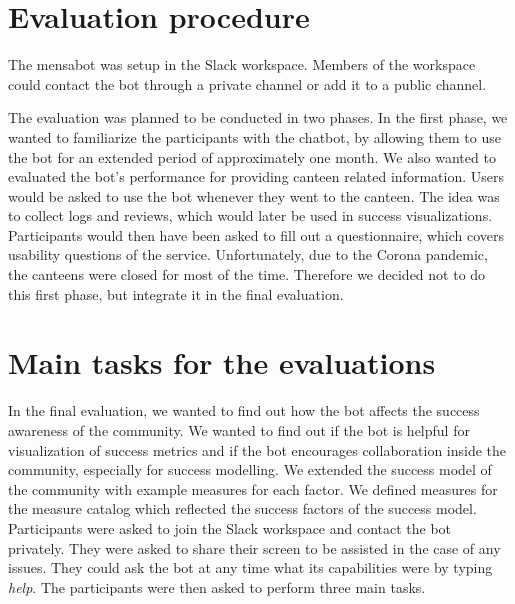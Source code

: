 \section{Evaluation procedure}
The mensabot was setup in the Slack workspace. Members of the workspace could contact the bot through a private channel or add it to a public channel.

The evaluation was planned to be conducted in two phases.
In the first phase, we wanted to familiarize the participants with the chatbot, by allowing them to use the bot for an extended period of approximately one month. 
We also wanted to evaluated the bot's performance for providing canteen related information.
Users would be asked to use the bot whenever they went to the canteen. The idea was to collect logs and reviews, which would later be used in success visualizations. 
Participants would then have been asked to fill out a questionnaire, which covers usability questions of the service.  
Unfortunately, due to the Corona pandemic, the canteens were closed for most of the time. Therefore we decided not to do this first phase, but integrate it in the final evaluation.

\section{Main tasks for the evaluations}
In the final evaluation, we wanted to find out how the bot affects the success awareness of the community.
We wanted to find out if the bot is helpful for visualization of success metrics and if the bot encourages collaboration inside the community, especially for success modelling.
We extended the success model of the community with example measures for each factor. We defined measures for the measure catalog which reflected the success factors of the success model.
Participants were asked to join the Slack workspace and contact the bot privately. They were asked to share their screen to be assisted in the case of any issues. They could ask the bot at any time what its capabilities were by typing \emph{help}.
The participants were then asked to perform three main tasks.

